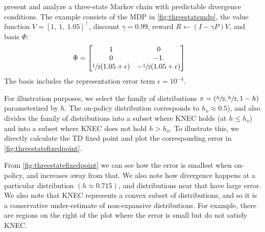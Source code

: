 \citet{manek2022pitfalls} present and analyze a three-state Markov chain with predictable divergence conditions. The example consists of the MDP in \cref{fig:threestatemdp}, the value function $V = [1,~1,~1.05]^\top$, discount $\gamma = 0.99$, reward $R \gets (I-\gamma P)V$, and basis $\Phi$:
\begin{align}
  \Phi & = \begin{bmatrix}
             1                              & 0                               \\
             0                              & -1.                             \\
             \sfrac{1}{2} (1.05 + \epsilon) & -\sfrac{1}{2} (1.05 + \epsilon) \\
           \end{bmatrix}
\end{align}
The basis includes the representation error term $\epsilon = 10^{-4}$.

For illustration purposes, we select the family of distributions $\pi = (\sfrac h 2, \sfrac h 2, 1- h)$ parameterized by $h$. The on-policy distribution corresponds to $h_o\approx 0.5$), and also divides the family of distributions into a subset where KNEC holds (at $h \leq h_o$) and into a subset where KNEC does not hold $h > h_o$. To illustrate this, we directly calculate the TD fixed point and plot the corresponding error in \cref{fig:threestatefixedpoint}.

From \cref{fig:threestatefixedpoint} we can see how the error is smallest when on-policy, and increases away from that. We also note how divergence happens at a particular distribution $(h\approx 0.715)$, and distributions near that have large error. We also note that KNEC represents a convex subset of distributions, and so it is a conservative under-estimate of non-expansive distributions. For example, there are regions on the right of the plot where the error is small but do not satisfy KNEC.

